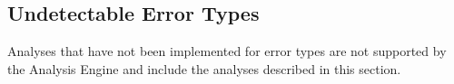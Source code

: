 \subsection{Undetectable Error Types}

Analyses that have not been implemented for error types are not supported by the Analysis Engine and include the analyses described in this section.

\newpar {}